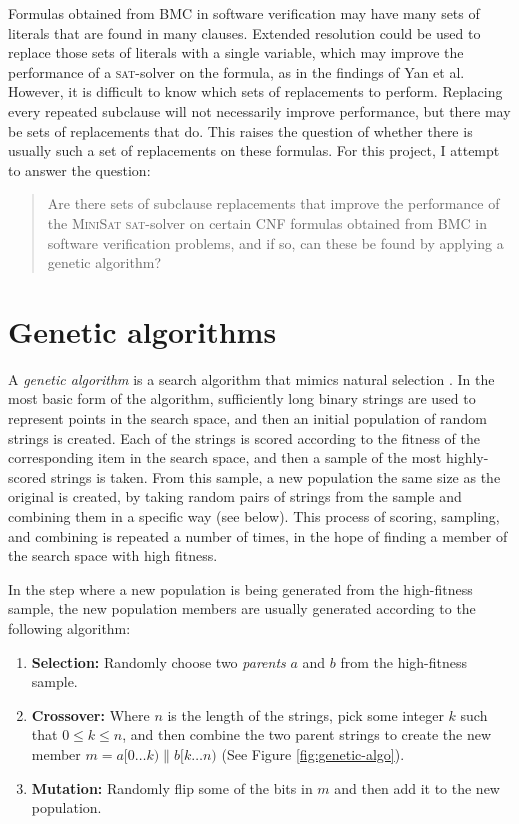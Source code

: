 \documentclass[proof,pdftex,11pt,a4,titlepage]{article}
\newcommand{\sat}{\textsc{sat}}
\begin{document}
Formulas obtained from BMC in software verification may have many sets of literals that are found in many clauses. Extended resolution could be used to replace those sets of literals with a single variable, which may improve the performance of a \sat{}-solver on the formula, as in the findings of Yan et al. However, it is difficult to know which sets of replacements to perform. Replacing every repeated subclause will not necessarily improve performance, but there may be sets of replacements that do. This raises the question of whether there is usually such a set of replacements on these formulas. For this project, I attempt to answer the question:
\begin{quote}
  Are there sets of subclause replacements that improve the performance of the \textsc{MiniSat} \sat{}-solver on certain CNF formulas obtained from BMC in software verification problems, and if so, can these be found by applying a genetic algorithm?
\end{quote}

\section{Genetic algorithms}
\label{sec:genetic}

A \emph{genetic algorithm} is a search algorithm that mimics natural selection  \cite{Goldberg:1989}. In the most basic form of the algorithm, sufficiently long binary strings are used to represent points in the search space, and then an initial population of random strings is created. Each of the strings is scored according to the fitness of the corresponding item in the search space, and then a sample of the most highly-scored strings is taken. From this sample, a new population the same size as the original is created, by taking random pairs of strings from the sample and combining them in a specific way (see below). This process of scoring, sampling, and combining is repeated a number of times, in the hope of finding a member of the search space with high fitness.

In the step where a new population is being generated from the high-fitness sample, the new population members are usually generated according to the following algorithm:

\begin{enumerate}
  \item {\bf Selection:} Randomly choose two \emph{parents} $a$ and $b$ from the high-fitness sample.
  \item {\bf Crossover:} Where $n$ is the length of the strings, pick some integer $k$ such that $0 \leq k \leq n$, and then combine the two parent strings to create the new member $m = a[0 \ldots k) \parallel b[k \ldots n)$ (See Figure \ref{fig:genetic-algo}).
  \item {\bf Mutation:} Randomly flip some of the bits in $m$ and then add it to the new population.
\end{enumerate}
\end{document}
